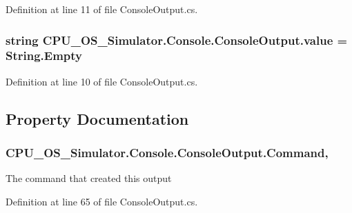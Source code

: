 Definition at line 11 of file Console\+Output.\+cs.

\hypertarget{class_c_p_u___o_s___simulator_1_1_console_1_1_console_output_a3bc577f947d51bc1b5c3880d5a7d5158}{}
\subsubsection[{value}]{\setlength{\rightskip}{0pt plus 5cm}string C\+P\+U\+\_\+\+O\+S\+\_\+\+Simulator.\+Console.\+Console\+Output.\+value = String.\+Empty\hspace{0.3cm}{\ttfamily [private]}}\label{class_c_p_u___o_s___simulator_1_1_console_1_1_console_output_a3bc577f947d51bc1b5c3880d5a7d5158}


Definition at line 10 of file Console\+Output.\+cs.



\subsection{Property Documentation}
\hypertarget{class_c_p_u___o_s___simulator_1_1_console_1_1_console_output_a15b8bc11762105b9b984135cf892a0b5}{}
\subsubsection[{Command}]{ C\+P\+U\+\_\+\+O\+S\+\_\+\+Simulator.\+Console.\+Console\+Output.\+Command\hspace{0.3cm}{\ttfamily [get]}, {\ttfamily [set]}}\label{class_c_p_u___o_s___simulator_1_1_console_1_1_console_output_a15b8bc11762105b9b984135cf892a0b5}


The command that created this output 



Definition at line 65 of file Console\+Output.\+cs.

